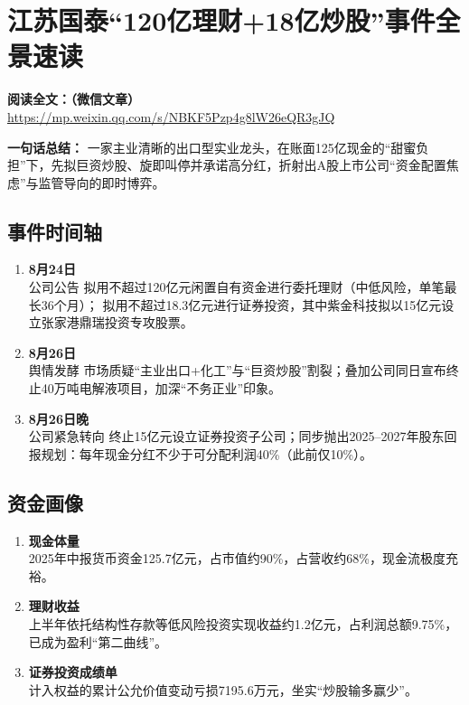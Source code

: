 \clearpage

\section{江苏国泰“120亿理财+18亿炒股”事件全景速读}
\vspace{1cm}
\noindent\textbf{阅读全文：（微信文章）} \url{https://mp.weixin.qq.com/s/NBKF5Pzp4g8lW26eQR3gJQ}

\textbf{一句话总结：}  
一家主业清晰的出口型实业龙头，在账面125亿现金的“甜蜜负担”下，先拟巨资炒股、旋即叫停并承诺高分红，折射出A股上市公司“资金配置焦虑”与监管导向的即时博弈。

\subsection{事件时间轴}
\begin{enumerate}[leftmargin=*, nosep]
    \item \textbf{8月24日}\\
    公司公告  
    拟用不超过120亿元闲置自有资金进行委托理财（中低风险，单笔最长36个月）；  
    拟用不超过18.3亿元进行证券投资，其中紫金科技拟以15亿元设立张家港鼎瑞投资专攻股票。
    \item \textbf{8月26日}\\
    舆情发酵  
    市场质疑“主业出口+化工”与“巨资炒股”割裂；叠加公司同日宣布终止40万吨电解液项目，加深“不务正业”印象。
    \item \textbf{8月26日晚} \\
    公司紧急转向  终止15亿元设立证券投资子公司；同步抛出2025–2027年股东回报规划：每年现金分红不少于可分配利润40\%（此前仅10\%）。
\end{enumerate}

\subsection{资金画像}
\begin{enumerate}[leftmargin=*, nosep]
    \item \textbf{现金体量}  \\
    2025年中报货币资金125.7亿元，占市值约90\%，占营收约68\%，现金流极度充裕。
    \item \textbf{理财收益}  \\
    上半年依托结构性存款等低风险投资实现收益约1.2亿元，占利润总额9.75\%，已成为盈利“第二曲线”。
    \item \textbf{证券投资成绩单}  \\
    计入权益的累计公允价值变动亏损7195.6万元，坐实“炒股输多赢少”。
\end{enumerate}

